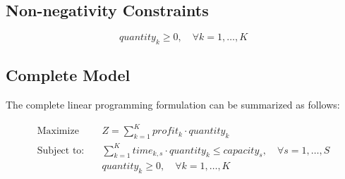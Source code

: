 \documentclass{article}
\begin{document}
\subsection*{Non-negativity Constraints}
\[
quantity_{k} \geq 0, \quad \forall k = 1, \ldots, K
\]

\subsection*{Complete Model}
The complete linear programming formulation can be summarized as follows:

\begin{align*}
\text{Maximize } & Z = \sum_{k=1}^{K} profit_{k} \cdot quantity_{k} \\
\text{Subject to:} \quad & \sum_{k=1}^{K} time_{k,s} \cdot quantity_{k} \leq capacity_{s}, \quad \forall s = 1, \ldots, S \\
& quantity_{k} \geq 0, \quad \forall k = 1, \ldots, K
\end{align*}
\end{document}
